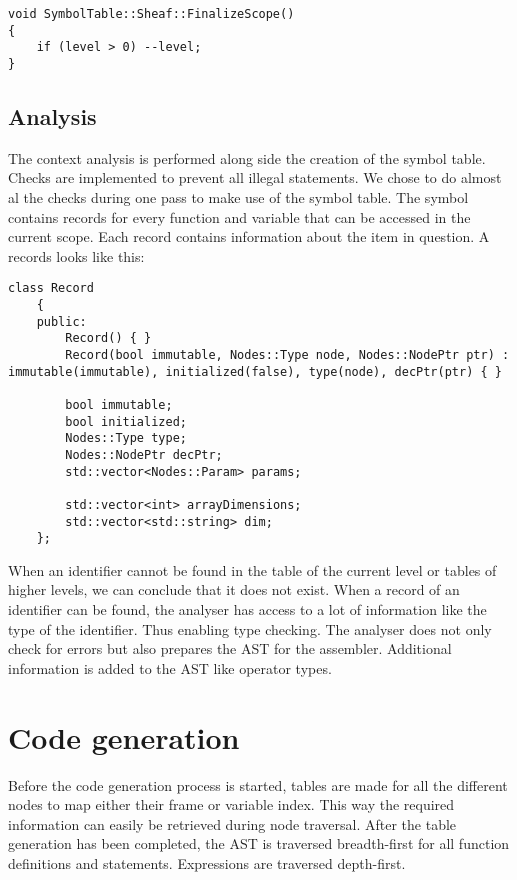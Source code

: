\documentclass[12pt]{article}
\begin{document}
\begin{lstlisting}
void SymbolTable::Sheaf::FinalizeScope()
{
	if (level > 0) --level;
}
\end{lstlisting}

\subsection{Analysis}

The context analysis is performed along side the creation of the symbol table. Checks are implemented to prevent all illegal statements. We chose to do almost al the checks during one pass to make use of the symbol table. The symbol contains records for every function and variable that can be accessed in the current scope. Each record contains information about the item in question. A records looks like this:

\begin{lstlisting}
class Record
	{
	public:
		Record() { }
		Record(bool immutable, Nodes::Type node, Nodes::NodePtr ptr) : immutable(immutable), initialized(false), type(node), decPtr(ptr) { }

		bool immutable;
		bool initialized;
		Nodes::Type type;
		Nodes::NodePtr decPtr;
		std::vector<Nodes::Param> params;

		std::vector<int> arrayDimensions;
		std::vector<std::string> dim;
	};
\end{lstlisting}

When an identifier cannot be found in the table of the current level or tables of higher levels, we can conclude that it does not exist. When a record of an identifier can be found, the analyser has access to a lot of information like the type of the identifier. Thus enabling type checking. The analyser does not only check for errors but also prepares the AST for the assembler. Additional information is added to the AST like operator types. 

\section{Code generation}

Before the code generation process is started, tables are made for all the different nodes to map either their frame or variable index. This way the required information can easily be retrieved during node traversal. After the table generation has been completed, the AST is traversed breadth-first for all function definitions and statements. Expressions are traversed depth-first.
\end{document}
